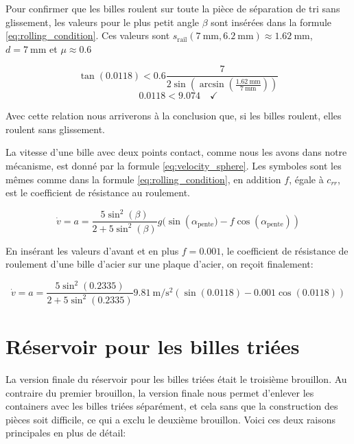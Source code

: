 Pour confirmer que les billes roulent sur toute la pièce de séparation de tri sans glissement, les valeurs pour le plus petit angle $\beta$ sont insérées dans la formule \ref{eq:rolling_condition}. Ces valeurs sont $s_{\text{rail}}(\SI{7}{\milli\metre},\SI{6.2}{\milli\metre}) \approx \SI{1.62}{\milli\metre}$, $d = \SI{7}{\milli\metre}$ et $\mu \approx \num{0.6}$

\[\tan(0.0118) < \num{0.6} \frac{7}{2\sin\left(\arcsin\left(\frac{\SI{1.62}{\milli\metre}}{\SI{7}{\milli\metre}}\right)\right)}\]
\[\num{0.0118} < \num{9.074} \quad \checkmark\]

Avec cette relation nous arriverons à la conclusion que, si les billes roulent, elles roulent sans glissement.

La vitesse d'une bille avec deux points contact, comme nous les avons dans notre mécanisme, est donné par la formule \ref{eq:velocity_sphere}. Les symboles sont les mêmes comme dans la formule \ref{eq:rolling_condition}, en addition $f$, égale à $c_{rr}$, est le coefficient de résistance au roulement.

\begin{equation}
    \dot{v} = a = \frac{5\sin^{2}(\beta)}{2+5\sin^{2}(\beta)} g(\sin({\alpha_{\text{pente}}) - f\cos(\alpha_{\text{pente}})})
    \label{eq:velocity_sphere}
\end{equation}

En insérant les valeurs d'avant et en plus $f = \num{0.001}$, le coefficient de résistance de roulement d'une bille d'acier sur une plaque d'acier, on reçoit finalement:

\[\dot{v} = a = \frac{5\sin^{2}(0.2335)}{2+5\sin^{2}(0.2335)} \SI{9.81}{\metre\per\second\squared}(\sin(\num{0.0118}) - \num{0.001}\cos(\num{0.0118}))\]



\section{Réservoir pour les billes triées}
La version finale du réservoir pour les billes triées était le troisième brouillon. Au contraire du premier brouillon, la version finale nous permet d'enlever les containers avec les billes triées séparément, et cela sans que la construction des pièces soit difficile, ce qui a exclu le deuxième brouillon. Voici ces deux raisons principales en plus de détail:

